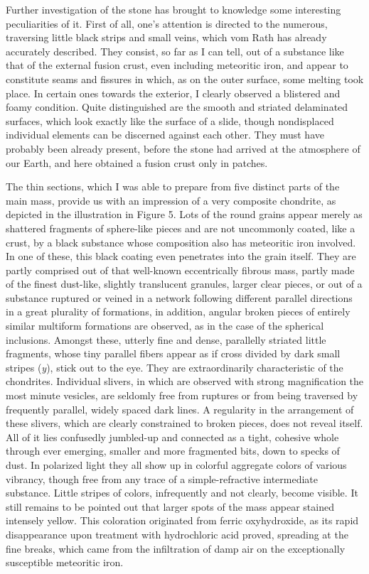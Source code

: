 \documentclass[a4paper, 12pt, oneside]{article}
\begin{document}
Further investigation of the stone has brought to knowledge some interesting peculiarities of it. First of all, one's attention is directed to the numerous, traversing little black strips and small veins, which vom Rath has already accurately described. They consist, so far as I can tell, out of a substance like that of the external fusion crust, even including meteoritic iron, and appear to constitute seams and fissures in which, as on the outer surface, some melting took place. In certain ones towards the exterior, I clearly observed a blistered and foamy condition. Quite distinguished are the smooth and striated delaminated surfaces, which look exactly like the surface of a slide, though nondisplaced individual elements can be discerned against each other. They must have probably been already present, before the stone had arrived at the atmosphere of our Earth, and here obtained a fusion crust only in patches.

The thin sections, which I was able to prepare from five distinct parts of the main mass, provide us with an impression of a very composite chondrite, as depicted in the illustration in Figure 5. Lots of the round grains appear merely as shattered fragments of sphere-like pieces and are not uncommonly coated, like a crust, by a black substance whose composition also has meteoritic iron involved. In one of these, this black coating even penetrates into the grain itself. They are partly comprised out of that well-known eccentrically fibrous mass, partly made of the finest dust-like, slightly translucent granules, larger clear pieces, or out of a substance ruptured or veined in a network following different parallel directions in a great plurality of formations, in addition, angular broken pieces of entirely similar multiform formations are observed, as in the case of the spherical inclusions. Amongst these, utterly fine and dense, parallelly striated little fragments, whose tiny parallel fibers appear as if cross divided by dark small stripes (\emph{y}), stick out to the eye. They are extraordinarily characteristic of the chondrites. Individual slivers, in which are observed with strong magnification the most minute vesicles, are seldomly free from ruptures or from being traversed by frequently parallel, widely spaced dark lines. A regularity in the arrangement of these slivers, which are clearly constrained to broken pieces, does not reveal itself. All of it lies confusedly jumbled-up and connected as a tight, cohesive whole through ever emerging, smaller and more fragmented bits, down to specks of dust. In polarized light they all show up in colorful aggregate colors of various vibrancy, though free from any trace of a simple-refractive intermediate substance. Little stripes of colors, infrequently and not clearly, become visible. It still remains to be pointed out that larger spots of the mass appear stained intensely yellow. This coloration originated from ferric oxyhydroxide, as its rapid disappearance upon treatment with hydrochloric acid proved, spreading at the fine breaks, which came from the infiltration of damp air on the exceptionally susceptible meteoritic iron.
\end{document}
